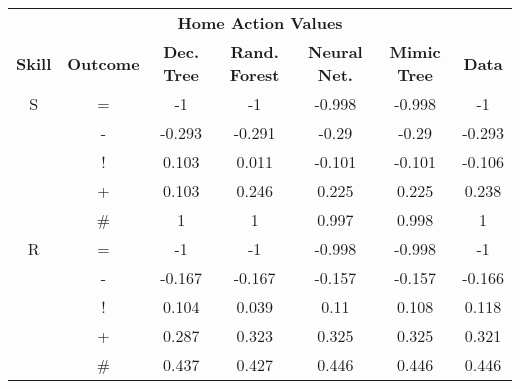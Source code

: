 \documentclass{sfuthesis}
\begin{document}
\begin{table}[]
	\centering
	\begin{tabular}{ccccccc}
		\multicolumn{7}{c}{\textbf{Home Action Values}} \\
		\textbf{Skill} & \multicolumn{1}{c|}{\textbf{Outcome}} & \textbf{Dec. Tree} & \textbf{Rand. Forest} & \textbf{Neural Net.} & \multicolumn{1}{c|}{\textbf{Mimic Tree}} & \textbf{Data} \\ \hline
		S              & \multicolumn{1}{c|}{=}                & -1                 & -1                    & -0.998               & \multicolumn{1}{c|}{-0.998}              & -1            \\
		& \multicolumn{1}{c|}{-}                & -0.293             & -0.291                & -0.29                & \multicolumn{1}{c|}{-0.29}               & -0.293        \\
		& \multicolumn{1}{c|}{!}                & 0.103              & 0.011                 & -0.101               & \multicolumn{1}{c|}{-0.101}              & -0.106        \\
		& \multicolumn{1}{c|}{+}                & 0.103              & 0.246                 & 0.225                & \multicolumn{1}{c|}{0.225}               & 0.238         \\
		& \multicolumn{1}{c|}{\#}               & 1                  & 1                     & 0.997                & \multicolumn{1}{c|}{0.998}               & 1             \\ \hline
		R              & \multicolumn{1}{c|}{=}                & -1                 & -1                    & -0.998               & \multicolumn{1}{c|}{-0.998}              & -1            \\
		& \multicolumn{1}{c|}{-}                & -0.167             & -0.167                & -0.157               & \multicolumn{1}{c|}{-0.157}              & -0.166        \\
		& \multicolumn{1}{c|}{!}                & 0.104              & 0.039                 & 0.11                 & \multicolumn{1}{c|}{0.108}               & 0.118         \\
		& \multicolumn{1}{c|}{+}                & 0.287              & 0.323                 & 0.325                & \multicolumn{1}{c|}{0.325}               & 0.321         \\
		& \multicolumn{1}{c|}{\#}               & 0.437              & 0.427                 & 0.446                & \multicolumn{1}{c|}{0.446}               & 0.446         \\ \hline

\end{tabular}
\end{table}
\end{document}
